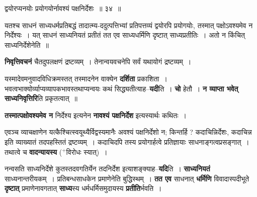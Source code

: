 \documentclass[article,12pt,a4paper]{memoir}
\newcommand{\add}[1]{($^{+}$#1)}
\begin{document}
	  \pstart द्वयोरप्यनयोः प्रयोगयोर्नावश्यं पक्षनिर्देशः ॥ ३४ ॥
	\pend
      
	  \endgroup
	 

	  \pstart यतश्च साधनं साध्यधर्मप्रतिबद्धं तादात्म्य-ददुत्पत्तिभ्यां प्रतिपत्तव्यं द्वयोरपि प्रयोगयोः, तस्मात् पक्षोऽवश्यमेव न निर्देश्यः । यत् साधनं साध्यनियतं प्रतीतं तत एव साध्यधर्मिणि दृष्टात् साध्यप्रतीतिः । अतो न किंचित् साध्यनिर्देशेनेति ॥
	\pend
      
	  \endgroup
	

	  \pstart \textbf{निवृत्तिवचनं} चैतदुपलक्षणं द्रष्टव्यम् । तेनान्वयवचनेपि सर्वं यथायोगं द्रष्टव्यम् ।
	\pend
      

	  \pstart यस्मादेवमनुवादविधिक्रमस्तत् तस्मादनेन वाक्येन \textbf{दर्शिता} प्रकाशिता । भवत्वभाक्योर्व्याप्यव्यापकभावस्तथाप्यन्वयः कथं सिद्ध्यतीत्याह--\textbf{यदी}ति । \textbf{चो} हेतौ । \textbf{न व्याप्ता भवेत् साध्यनिवृत्तिरि}ति प्रकृतत्वात् ॥
	\pend
      

	  \pstart \textbf{तस्मात्पक्षोवश्यमेव न} निर्देश्य इत्यनेन \textbf{नावश्यं पक्षनिर्देश} इत्यस्यार्थः कथितः ।
	\pend
      

	  \pstart एवञ्च व्याचक्षाणेन यत्कैश्चित्स्वयूथ्यैर्विद्वस्यमानैः अवश्यं पक्षनिर्देशो न; किन्तर्हि ? कदाचिन्निर्देशः, कदाचिन्न इति व्याख्यातं तदपहस्तितं द्रष्टव्यम् । कदाचिदपि तस्य प्रयोगार्हत्वे प्रतिज्ञायाः साधनाङ्गत्वप्रसङ्गात् । तथात्वे च \textbf{वादन्यायस्य}\leavevmode{} \add{विरोधः स्यात्} ।
	\pend
      

	  \pstart नन्वसति साध्यनिर्देशे कुतस्तदवगतिर्येन तदनिर्देश इत्याशङ्क्याह--\textbf{यदि}ति । \textbf{साध्यनियतं} साध्यनान्तरीयकम् । प्रतिबन्धसाधकेन प्रमाणेनेति बुद्धिस्थम् । \textbf{तत एव} साधनात् \textbf{धर्मिणि} विवादास्पदीभूते \textbf{दृष्टात्} प्रमाणेनावगतात् \textbf{साध्य}स्य धर्मधर्मिसमुदायस्य \textbf{प्रतीति}र्भवति ।
	\pend
      
\end{document}
